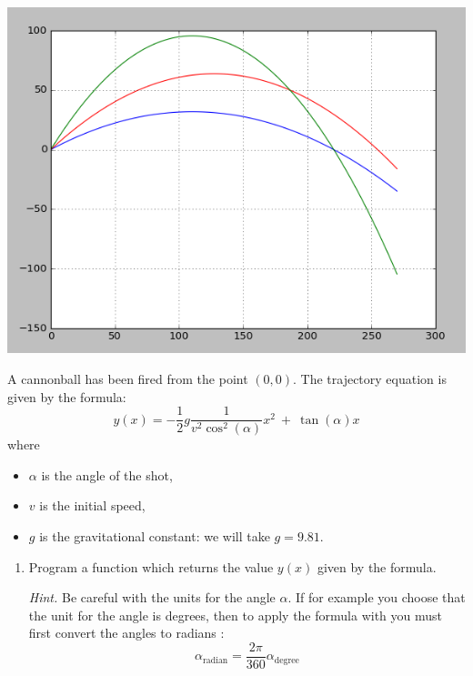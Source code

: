 \documentclass[11pt,class=report,crop=false]{standalone}
\begin{document}
\begin{activite}[Ballistics]



\begin{center}
\includegraphics[scale=\myscale,scale=0.45]{screen-lists-I-tir-bis}
\end{center}

A cannonball has been fired from the point $(0,0)$. The trajectory equation is given by the formula:
$$y(x) = -\frac12  g \frac{1}{v^2 \cos^2(\alpha)} x^2 \  + \   \tan (\alpha)  x$$
where
\begin{itemize}
  \item $\alpha$ is the angle of the shot,
  \item $v$ is the initial speed,
  \item $g$ is the gravitational constant: we will take $g = 9.81$.
\end{itemize}


\begin{enumerate}
  \item Program a function 
  which returns the value $y(x)$ given by the formula.
  
  \emph{Hint.} Be careful with the units for the angle $\alpha$. If for example you choose that the unit for the angle is degrees, then to apply the formula with \Python{} you must first convert the angles to radians :
  $$\alpha_{\text{radian}} = \frac{2\pi}{360} \alpha_{\text{degree}}$$
  

\end{enumerate}
\end{activite}
\end{document}
